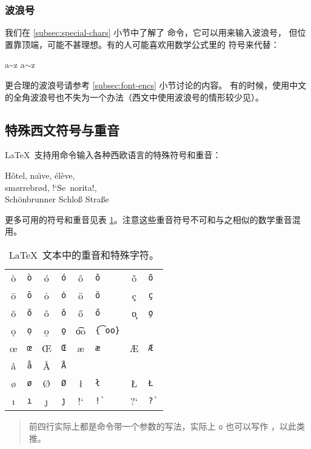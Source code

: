 {\subsubsection{波浪号}

我们在 \ref{subsec:special-chars} 小节中了解了 \cmd{\textasciitilde} 命令，它可以用来输入波浪号，
但位置靠顶端，可能不甚理想。有的人可能喜欢用数学公式里的  符号来代替：
\begin{example}
a\~{}z \qquad a$\sim$z
\end{example}

更合理的波浪号请参考 \ref{subsec:font-encs} 小节讨论的内容。
有的时候，使用中文的全角波浪号也不失为一个办法（西文中使用波浪号的情形较少见）。

\subsection{特殊西文符号与重音}\label{subsec:accents}

\LaTeX\ 支持用命令输入各种西欧语言的特殊符号和重音：
\begin{example}
H\^otel, na\"\i ve, \'el\`eve,\\
sm\o rrebr\o d, !`Se\ norita!,\\
Sch\"onbrunner Schlo\ss{}
Stra\ss e
\end{example}

更多可用的符号和重音见表 \ref{tbl:accents}。注意这些重音符号不可和与之相似的数学重音混用。

\def\TSYM #1{#1       & \texttt{\string#1}}
\def\TACC #1#2{#1{#2} & \texttt{\string#1#2}}       %
\def\TTACC #1#2{#1{#2} & \texttt{\string#1 #2}}     %
\def\WTACC #1#2{#1{#2} & \texttt{\string#1\{#2\}}}  %
\begin{table}[htbp]
\centering
\caption{\LaTeX\ 文本中的重音和特殊字符。} \label{tbl:accents}
\begin{tabular}{*4{cl}}
 \hline
 \TACC{\`}{o} & \TACC{\'}{o} & \TACC{\^}{o} & \TACC{\~}{o} \\
 \TACC{\=}{o} & \TACC{\.}{o} & \TACC{\"}{o} & \TTACC{\c}{c}\\
 \TTACC{\u}{o} & \TTACC{\v}{o} & \TTACC{\H}{o} & \TTACC{\c}{o} \\
 \TTACC{\d}{o} & \TTACC{\b}{o} & \WTACC{\t}{oo} \\[6pt]
 \TSYM{\oe} & \TSYM{\OE} & \TSYM{\ae} & \TSYM{\AE} \\
 \TSYM{\aa} & \TSYM{\AA} \\[6pt]
 \TSYM{\o}  & \TSYM{\O}  & \TSYM{\l} & \TSYM{\L} \\
 \TSYM{\i}  & \TSYM{\j}  & !` & \verb|!`| & ?` & \verb|?`| \\
 \hline
\end{tabular}
\begin{quote}\footnotesize%
前四行实际上都是命令带一个参数的写法，实际上 \cmd{\textasciicircum}\texttt{o} 也可以写作
\cmd{\textasciicircum}，以此类推。
\end{quote}
\end{table}

}
